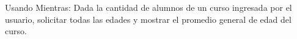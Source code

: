 ﻿
Usando Mientras: Dada la cantidad de alumnos de un curso ingresada por el usuario, solicitar todas las edades y mostrar el promedio general de edad del curso.


\newpage
{}

\volverindice
\newpage
